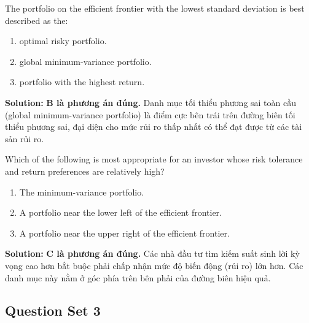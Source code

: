 \begin{tcolorbox}[
	colback=gray!5!white,
	colframe=black!15!white,
	boxrule=0.5pt,
	arc=3pt,
	title=\textbf{Question 3},
	coltitle=black,
	colbacktitle=black!5!white,
	before skip=6pt,
	after skip=6pt,
	breakable
]
The portfolio on the efficient frontier with the lowest standard deviation is best described as the:
\begin{enumerate}[label=\Alph*.]
	\item optimal risky portfolio.
	\item global minimum-variance portfolio.
	\item portfolio with the highest return.
\end{enumerate}

\textbf{Solution:}
\textbf{B là phương án đúng.} Danh mục tối thiểu phương sai toàn cầu (global minimum-variance portfolio) là điểm cực bên trái trên đường biên tối thiểu phương sai, đại diện cho mức rủi ro thấp nhất có thể đạt được từ các tài sản rủi ro.
\end{tcolorbox}

\begin{tcolorbox}[
	colback=gray!5!white,
	colframe=black!15!white,
	boxrule=0.5pt,
	arc=3pt,
	title=\textbf{Question 4},
	coltitle=black,
	colbacktitle=black!5!white,
	before skip=6pt,
	after skip=6pt,
	breakable
]
Which of the following is most appropriate for an investor whose risk tolerance and return preferences are relatively high?
\begin{enumerate}[label=\Alph*.]
	\item The minimum-variance portfolio.
	\item A portfolio near the lower left of the efficient frontier.
	\item A portfolio near the upper right of the efficient frontier.
\end{enumerate}

\textbf{Solution:}
\textbf{C là phương án đúng.} Các nhà đầu tư tìm kiếm suất sinh lời kỳ vọng cao hơn bắt buộc phải chấp nhận mức độ biến động (rủi ro) lớn hơn. Các danh mục này nằm ở góc phía trên bên phải của đường biên hiệu quả.
\end{tcolorbox}

\subsection{Question Set 3}
\label{subsec:app_Question Set 3}

